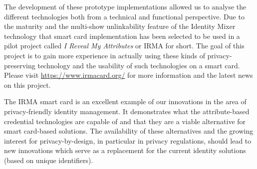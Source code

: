 The development of these prototype implementations allowed us to analyse the
different technologies both from a technical and functional perspective. Due to
the maturity and the multi-show unlinkability feature of the Identity Mixer
 technology that smart card implementation has been
selected to be used in a pilot project called \emph{I Reveal My Attributes} or
IRMA for short. The goal of this project is to gain more experience in actually
using these kinds of privacy-preserving technology and the usability of such
technologies on a smart card. Please visit \url{https://www.irmacard.org/} for
more information and the latest news on this project.

The IRMA smart card is an excellent example of our innovations in the area of
privacy-friendly identity management. It demonstrates what the attribute-based
credential technologies are capable of and that they are a viable alternative
for smart card-based solutions. The availability of these alternatives and the
growing interest for privacy-by-design, in particular in privacy regulations,
should lead to new innovations which serve as a replacement for the current
identity solutions (based on unique identifiers).
